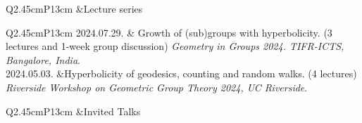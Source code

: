 \documentclass[a4paper, 10pt]{article}
\begin{document}
\vspace{8pt}
\begin{tabular}{Q{2.45cm}P{13cm}}
&{\large Lecture series}
\end{tabular}
\vspace{6pt}

\begin{tabular}{Q{2.45cm}P{13cm}}
\small{2024.07.29.} & Growth of (sub)groups with hyperbolicity. (3 lectures and 1-week group discussion) \textit{Geometry in Groups 2024. TIFR-ICTS, Bangalore, India}.\\
\small{2024.05.03.} &Hyperbolicity of geodesics, counting and random walks. (4 lectures) \textit{Riverside Workshop on Geometric Group Theory 2024, UC Riverside}. \\
\end{tabular}

\vspace{8pt}
\begin{tabular}{Q{2.45cm}P{13cm}}
&{\large Invited Talks}
\end{tabular}
\vspace{6pt}
\end{document}
